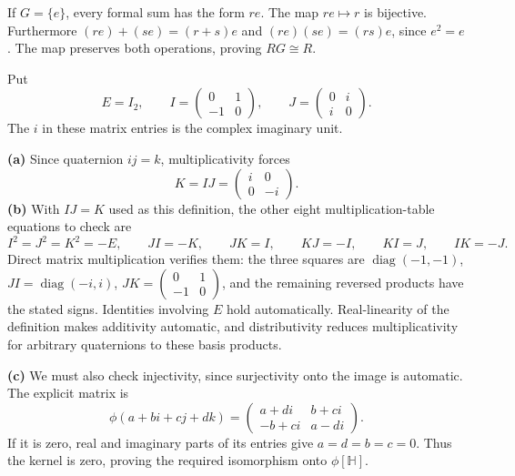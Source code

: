 If $G=\{e\}$, every formal sum has the form $re$. The map $re\mapsto r$ is bijective. Furthermore $(re)+(se)=(r+s)e$ and $(re)(se)=(rs)e$, since $e^2=e$. The map preserves both operations, proving $RG\cong R$.

Put
\[E=I_2,\qquad I=\begin{pmatrix}0&1\\-1&0\end{pmatrix},\qquad
J=\begin{pmatrix}0&i\\i&0\end{pmatrix}.
\]
The $i$ in these matrix entries is the complex imaginary unit.\par
\textbf{(a)} Since quaternion $ij=k$, multiplicativity forces
\[\boxed{K=IJ=\begin{pmatrix}i&0\\0&-i\end{pmatrix}}.
\]
\textbf{(b)} With $IJ=K$ used as this definition, the other eight multiplication-table equations to check are
\[I^2=J^2=K^2=-E,\qquad JI=-K,\qquad JK=I,\qquad KJ=-I,\qquad KI=J,\qquad IK=-J.
\]
Direct matrix multiplication verifies them: the three squares are $\operatorname{diag}(-1,-1)$, $JI=\operatorname{diag}(-i,i)$, $JK=\begin{pmatrix}0&1\\-1&0\end{pmatrix}$, and the remaining reversed products have the stated signs. Identities involving $E$ hold automatically. Real-linearity of the definition makes additivity automatic, and distributivity reduces multiplicativity for arbitrary quaternions to these basis products.\par
\textbf{(c)} We must also check injectivity, since surjectivity onto the image is automatic. The explicit matrix is
\[\phi(a+bi+cj+dk)=\begin{pmatrix}a+di&b+ci\\-b+ci&a-di\end{pmatrix}.
\]
If it is zero, real and imaginary parts of its entries give $a=d=b=c=0$. Thus the kernel is zero, proving the required isomorphism onto $\phi[\mathbb H]$.

